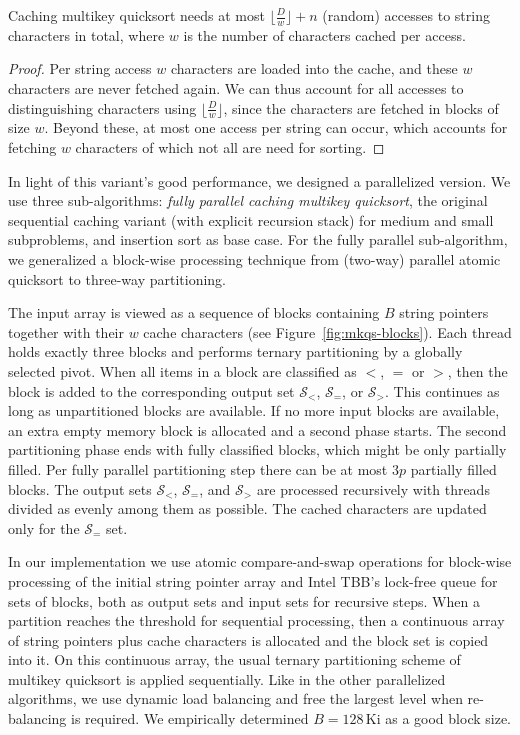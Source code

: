 \documentclass[a4paper]{myjournal}
\newcommand{\Strings}{\mathcal{S}}
\begin{document}
\begin{theorem}\label{thm:mkqs-access}
  Caching multikey quicksort needs at most $\lfloor \frac{D}{w} \rfloor + n$
  (random) accesses to string characters in total, where $w$ is the number of
  characters cached per access.
\end{theorem}
\begin{proof}
  Per string access $w$ characters are loaded into the cache, and these $w$
  characters are never fetched again. We can thus account for all accesses to
  distinguishing characters using $\lfloor \frac{D}{w} \rfloor$, since the
  characters are fetched in blocks of size $w$. Beyond these, at most one access
  per string can occur, which accounts for fetching $w$ characters of which not
  all are need for sorting.
\end{proof}

In light of this variant's good performance, we designed a parallelized
version. We use three sub-algorithms: \emph{fully parallel caching multikey
  quicksort}, the original sequential caching variant (with explicit recursion
stack) for medium and small subproblems, and insertion sort as base case. For
the fully parallel sub-algorithm, we generalized a block-wise processing
technique from (two-way) parallel atomic quicksort \cite{tsigas2003simple} to
three-way partitioning.

The input array is viewed as a sequence of blocks containing $B$ string pointers
together with their $w$ cache characters (see
Figure~\ref{fig:mkqs-blocks}). Each thread holds exactly three blocks and
performs ternary partitioning by a globally selected pivot. When all items in a
block are classified as $<$, $=$ or $>$, then the block is added to the
corresponding output set $\Strings_<$, $\Strings_=$, or $\Strings_>$. This
continues as long as unpartitioned blocks are available. If no more input blocks
are available, an extra empty memory block is allocated and a second phase
starts. The second partitioning phase ends with fully classified blocks, which
might be only partially filled. Per fully parallel partitioning step there can
be at most $3 p$ partially filled blocks. The output sets $\Strings_<$,
$\Strings_=$, and $\Strings_>$ are processed recursively with threads divided as
evenly among them as possible. The cached characters are updated only for the
$\Strings_=$ set.

In our implementation we use atomic compare-and-swap operations for block-wise
processing of the initial string pointer array and Intel TBB's lock-free queue
for sets of blocks, both as output sets and input sets for recursive steps. When
a partition reaches the threshold for sequential processing, then a continuous
array of string pointers plus cache characters is allocated and the block set is
copied into it. On this continuous array, the usual ternary partitioning scheme
of multikey quicksort is applied sequentially. Like in the other parallelized
algorithms, we use dynamic load balancing and free the largest level when
re-balancing is required. We empirically determined $B = 128\,\text{Ki}$ as a
good block size.
\end{document}
